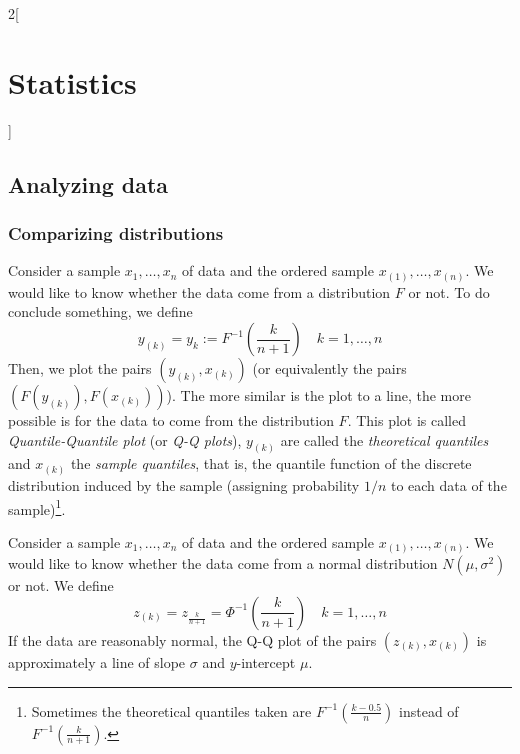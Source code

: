 \documentclass[../../../main.tex]{subfiles}
\begin{document}
\begin{multicols}{2}[\section{Statistics}]
  \subsection{Analyzing data}
  \subsubsection{Comparizing distributions}
  \begin{definition}[Q-Q plots]
    Consider a sample $x_1,\ldots,x_n$ of data and the ordered sample $x_{(1)},\ldots,x_{(n)}$. We would like to know whether the data come from a distribution $F$ or not. To do conclude something, we define $$y_{(k)}=y_k:=F^{-1}\left(\frac{k}{n+1}\right)\quad k=1,\ldots,n$$
    Then, we plot the pairs $(y_{(k)},x_{(k)})$ (or equivalently the pairs $(F(y_{(k)}),F(x_{(k)}))$). The more similar is the plot to a line, the more possible is for the data to come from the distribution $F$. This plot is called \emph{Quantile-Quantile plot} (or \emph{Q-Q plots}), $y_{(k)}$ are called the \emph{theoretical quantiles} and $x_{(k)}$ the \emph{sample quantiles}, that is, the quantile function of the discrete distribution induced by the sample (assigning probability $1/n$ to each data of the sample)\footnote{Sometimes the theoretical quantiles taken are $F^{-1}\left(\frac{k-0.5}{n}\right)$ instead of $F^{-1}\left(\frac{k}{n+1}\right)$.}.
  \end{definition}
  \begin{proposition}
    Consider a sample $x_1,\ldots,x_n$ of data and the ordered sample $x_{(1)},\ldots,x_{(n)}$. We would like to know whether the data come from a normal distribution $N(\mu,\sigma^2)$ or not. We define $$z_{(k)}=z_{\frac{k}{n+1}}=\Phi^{-1}\left(\frac{k}{n+1}\right)\quad k=1,\ldots,n$$
    If the data are reasonably normal, the Q-Q plot of the pairs $(z_{(k)},x_{(k)})$ is approximately a line of slope $\sigma$ and $y$-intercept $\mu$.
  \end{proposition}
  \begin{center}
    \begin{minipage}{\linewidth}
      \centering
      
    \end{minipage}
  \end{center}
\end{multicols}
\end{document}
